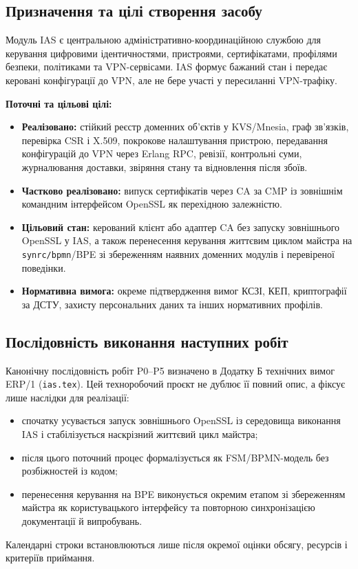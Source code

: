 \documentclass{article}
\begin{document}
\subsection{Призначення та цілі створення засобу}
Модуль IAS є центральною адміністративно-координаційною службою для керування цифровими ідентичностями, пристроями, сертифікатами, профілями безпеки, політиками та VPN-сервісами. IAS формує бажаний стан і передає керовані конфігурації до VPN, але не бере участі у пересиланні VPN-трафіку.

\textbf{Поточні та цільові цілі:}
\begin{itemize}
    \item \textbf{Реалізовано:} стійкий реєстр доменних об'єктів у KVS/Mnesia, граф зв'язків, перевірка CSR і X.509, покрокове налаштування пристрою, передавання конфігурацій до VPN через Erlang RPC, ревізії, контрольні суми, журналювання доставки, звіряння стану та відновлення після збоїв.
    \item \textbf{Частково реалізовано:} випуск сертифікатів через CA за CMP із зовнішнім командним інтерфейсом OpenSSL як перехідною залежністю.
    \item \textbf{Цільовий стан:} керований клієнт або адаптер CA без запуску зовнішнього OpenSSL у IAS, а також перенесення керування життєвим циклом майстра на \texttt{synrc/bpmn}/BPE зі збереженням наявних доменних модулів і перевіреної поведінки.
    \item \textbf{Нормативна вимога:} окреме підтвердження вимог КСЗІ, КЕП, криптографії за ДСТУ, захисту персональних даних та інших нормативних профілів.
\end{itemize}

\subsection{Послідовність виконання наступних робіт}
Канонічну послідовність робіт P0--P5 визначено в Додатку Б технічних вимог ERP/1 (\texttt{ias.tex}). Цей техноробочий проєкт не дублює її повний опис, а фіксує лише наслідки для реалізації:
\begin{itemize}
    \item спочатку усувається запуск зовнішнього OpenSSL із середовища виконання IAS і стабілізується наскрізний життєвий цикл майстра;
    \item після цього поточний процес формалізується як FSM/BPMN-модель без розбіжностей із кодом;
    \item перенесення керування на BPE виконується окремим етапом зі збереженням майстра як користувацького інтерфейсу та повторною синхронізацією документації й випробувань.
\end{itemize}
Календарні строки встановлюються лише після окремої оцінки обсягу, ресурсів і критеріїв приймання.
\end{document}
